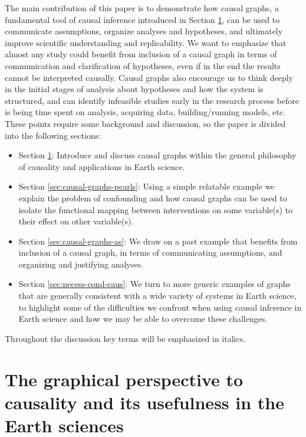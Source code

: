 \documentclass[12pt]{article}
\begin{document}
The main contribution of this paper is to demonstrate how causal
graphs, a fundamental tool of causal inference introduced in Section
\ref{sec:what-caus-caus}, can be used to communicate assumptions,
organize analyses and hypotheses, and ultimately improve scientific understanding and replicability. We
want to emphasize that almost any study could benefit from inclusion
of a causal graph in terms of communication and clarification of hypotheses, even if
in the end the results cannot be interpreted causally. Causal graphs
also encourage us to think deeply in the initial stages of analysis
about hypotheses and how the system is structured, and can
identify infeasible studies early in the research process before is being time
spent on analysis, acquiring data, building/running models,
etc. These points require some background and discussion, so the
paper is divided into the following sections:

\begin{itemize}
\item Section \ref{sec:what-caus-caus}: Introduce and discuss causal
  graphs within the general philosophy of causality and applications
  in Earth science.
\item Section \ref{sec:causal-graphs-pearls}: Using a simple relatable
  example we explain the problem of confounding and how causal graphs
  can be used to isolate the functional mapping between interventions
  on some variable(s) to their effect on other variable(s).
\item Section \ref{sec:causal-graphs-as}: We draw on a past example
  that benefits from inclusion of a causal graph, in terms of
  communicating assumptions, and organizing and justifying analyses.
\item Section \ref{sec:necess-cond-caus}: We turn to more generic
  examples of graphs that are generally consistent with a wide variety
  of systems in Earth science, to highlight some of the difficulties
  we confront when using causal inference in Earth science and how we
  may be able to overcome these challenges.
\end{itemize}

Throughout the discussion key terms will be emphasized in italics.

\section{The graphical
  perspective to causality and its usefulness in the Earth
  sciences}\label{sec:what-caus-caus}
\end{document}
